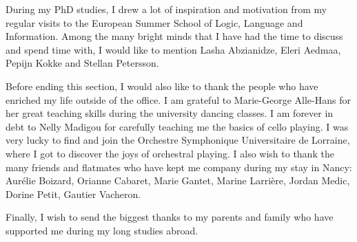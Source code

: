 During my PhD studies, I drew a lot of inspiration and motivation from my
regular visits to the European Summer School of Logic, Language and Information.
Among the many bright minds that I have had the time to discuss and spend time
with, I would like to mention Lasha Abzianidze, Eleri Aedmaa, Pepijn Kokke and
Stellan Petersson.

Before ending this section, I would also like to thank the people who have
enriched my life outside of the office. I am grateful to Marie-George Alle-Hans
for her great teaching skills during the university dancing classes. I am
forever in debt to Nelly Madigou for carefully teaching me the basics of cello
playing. I was very lucky to find and join the Orchestre Symphonique
Universitaire de Lorraine, where I got to discover the joys of orchestral
playing. I also wish to thank the many friends and flatmates who have kept me
company during my stay in Nancy: Aurélie Boizard, Orianne Cabaret, Marie Gantet,
Marine Larrière, Jordan Medic, Dorine Petit, Gautier Vacheron.

Finally, I wish to send the biggest thanks to my parents and family who have
supported me during my long studies abroad.